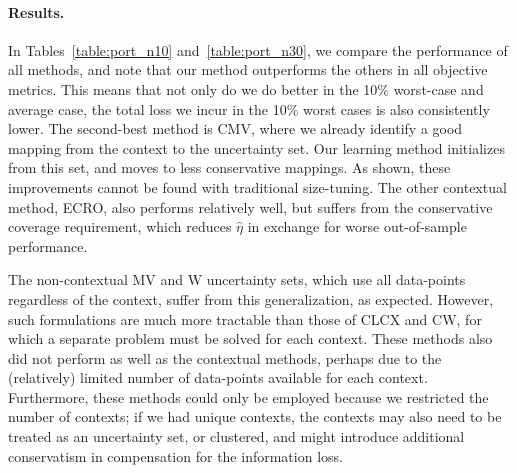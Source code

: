 \documentclass[11pt]{article}
\newcommand{\bsnote}[1]{\noindent\textcolor{red}{\texttt{Bartolomeo: #1}}}
\newcommand{\RC}[1]{\textcolor{black}{#1}}
\begin{document}
\paragraph{Results.}
In Tables~\ref{table:port_n10} and~\ref{table:port_n30}, we compare the performance of all methods, and note that our method outperforms the others in all objective metrics. This means that not only do we do better in the 10\% worst-case and average case, the total loss we incur in the 10\% worst cases is also consistently lower.
The second-best method is CMV, where we already identify a good mapping from the context to the uncertainty set. Our learning method initializes from this set, and moves to less conservative mappings. As shown, these improvements cannot be found with traditional size-tuning. The other contextual method, ECRO, also performs relatively well, but suffers from the conservative coverage requirement, which reduces $\hat{\eta}$ in exchange for worse out-of-sample performance.


The non-contextual MV and W uncertainty sets, which use all data-points regardless of the context, suffer from this generalization, as expected. However, such formulations are much more tractable than those of CLCX and CW, for which a separate problem must be solved for each context.
These methods also did not perform as well as the contextual methods, perhaps due to the (relatively) limited number of data-points available for each context.
Furthermore, these methods could only be employed because we restricted the number of contexts; if we had unique contexts, the contexts may also need to be treated as an uncertainty set, or clustered, and might introduce additional conservatism in compensation for the information loss.
\end{document}
